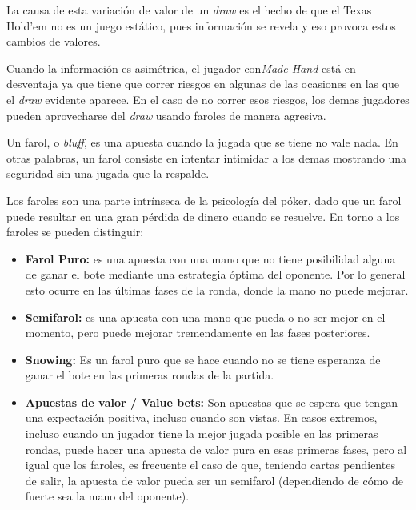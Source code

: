 La causa de esta variación de valor de un \textit{draw} es el hecho de que el Texas Hold'em no es un juego estático, pues información se revela y eso provoca estos cambios de valores. 

Cuando la información es asimétrica, el jugador con\textit{Made Hand} está en desventaja ya que tiene que correr riesgos en algunas de las ocasiones en las que el \textit{draw} evidente aparece. En el caso de no correr esos riesgos, los demas jugadores pueden aprovecharse del \textit{draw} usando faroles de manera agresiva.\cite{chen}

Un farol, o \textit{bluff}, es una apuesta cuando la jugada que se tiene no vale nada. En otras palabras, un farol consiste en intentar intimidar a los demas mostrando una seguridad sin una jugada que la respalde.

Los faroles son una parte intrínseca de la psicología del póker, dado que un farol puede resultar en una gran pérdida de dinero cuando se resuelve. En torno a los faroles se pueden distinguir:\cite{chen}
\begin{itemize}
\item \textbf{Farol Puro:} es una apuesta con una mano que no tiene posibilidad alguna de ganar el bote mediante una estrategia óptima del oponente. Por lo general esto ocurre en las últimas fases de la ronda, donde la mano no puede mejorar.
\item \textbf{Semifarol:} es una apuesta con una mano que pueda o no ser mejor en el momento, pero puede mejorar tremendamente en las fases posteriores.
\item \textbf{Snowing:} Es un farol puro que se hace cuando no se tiene esperanza de ganar el bote en las primeras rondas de la partida.
\item \textbf{Apuestas de valor / Value bets:} Son apuestas que se espera que tengan una expectación positiva, incluso cuando son vistas. En casos extremos, incluso cuando un jugador tiene la mejor jugada posible en las primeras rondas, puede hacer una apuesta de valor pura en esas primeras fases, pero al igual que los faroles, es frecuente el caso de que, teniendo cartas pendientes de salir, la apuesta de valor pueda ser un semifarol (dependiendo de cómo de fuerte sea la mano del oponente). \cite{chen}
\end{itemize}
